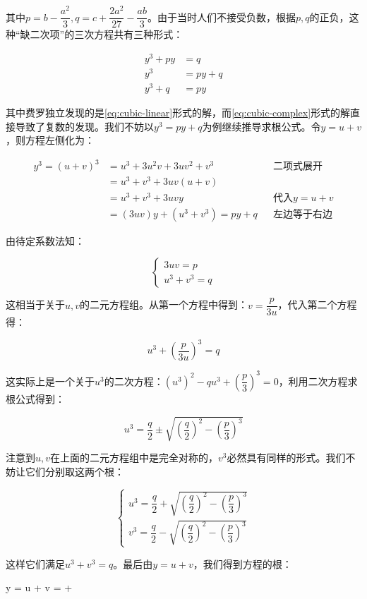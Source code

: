 \documentclass[b5paper]{ctexart}
\begin{document}
其中$p = b - \dfrac{a^2}{3}, q = c + \dfrac{2a^2}{27} - \dfrac{ab}{3}$。由于当时人们不接受负数，根据$p, q$的正负，这种“缺二次项”的三次方程共有三种形式：

\begin{align}
y^3 + py &= q \label{eq:cubic-linear} \\
     y^3 &= py + q \label{eq:cubic-complex} \\
y^3 + q &= py
\end{align}

其中费罗独立发现的是\cref{eq:cubic-linear}形式的解，而\cref{eq:cubic-complex}形式的解直接导致了复数的发现。我们不妨以$y^3 = py + q$为例继续推导求根公式。令$y = u + v$，则方程左侧化为：

\begin{align*}
y^3 = (u + v)^3 &= u^3 + 3u^2v + 3uv^2 + v^3 && \text{二项式展开} \\
  &= u^3 + v^3 + 3uv(u + v) \\
  &= u^3 + v^3 + 3uvy && \text{代入} y = u + v \\
  &= (3uv)y + (u^3 + v^3) = py + q && \text{左边等于右边}
\end{align*}

由待定系数法知：

\[
\begin{cases}
  3uv = p \\
  u^3 + v^3 = q
\end{cases}
\]

这相当于关于$u, v$的二元方程组。从第一个方程中得到：$v = \dfrac{p}{3u}$，代入第二个方程得：

\[
u^3 + (\frac{p}{3u})^3 = q
\]

这实际上是一个关于$u^3$的二次方程：$(u^3)^2 - qu^3 + (\dfrac{p}{3})^3 = 0$，利用二次方程求根公式得到：

\[
u^3 = \frac{q}{2} \pm \sqrt{(\frac{q}{2})^2 - (\frac{p}{3})^3}
\]

注意到$u, v$在上面的二元方程组中是完全对称的，$v^3$必然具有同样的形式。我们不妨让它们分别取这两个根：

\[
\begin{cases}
u^3 = \dfrac{q}{2} + \sqrt{(\dfrac{q}{2})^2 - (\dfrac{p}{3})^3} \\
v^3 = \dfrac{q}{2} - \sqrt{(\dfrac{q}{2})^2 - (\dfrac{p}{3})^3}
\end{cases}
\]

这样它们满足$u^3 + v^3 = q$。最后由$y = u + v$，我们得到方程的根：

\be \label{eq:cardano}
y = u + v =  + 
\ee
\end{document}
